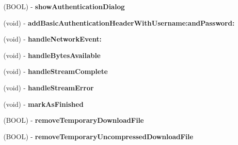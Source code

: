 \begin{DoxyCompactItemize}
\item 
\hypertarget{interface_a_s_i_h_t_t_p_request_a64d812546f152b29ddd614938ffa5539}{
(\-B\-O\-O\-L) -\/ {\bfseries show\-Authentication\-Dialog}}
\label{interface_a_s_i_h_t_t_p_request_a64d812546f152b29ddd614938ffa5539}

\item 
\hypertarget{interface_a_s_i_h_t_t_p_request_a0295b7fbbc9af2be76f9dfe06f75f1ca}{
(void) -\/ {\bfseries add\-Basic\-Authentication\-Header\-With\-Username\-:and\-Password\-:}}
\label{interface_a_s_i_h_t_t_p_request_a0295b7fbbc9af2be76f9dfe06f75f1ca}

\item 
\hypertarget{interface_a_s_i_h_t_t_p_request_a271ec6e669cafa5063866022fb3577ba}{
(void) -\/ {\bfseries handle\-Network\-Event\-:}}
\label{interface_a_s_i_h_t_t_p_request_a271ec6e669cafa5063866022fb3577ba}

\item 
\hypertarget{interface_a_s_i_h_t_t_p_request_aefae44a699dc9e70b78930322cfb3558}{
(void) -\/ {\bfseries handle\-Bytes\-Available}}
\label{interface_a_s_i_h_t_t_p_request_aefae44a699dc9e70b78930322cfb3558}

\item 
\hypertarget{interface_a_s_i_h_t_t_p_request_aaf27f7d11cd1194d5087db56cc553d89}{
(void) -\/ {\bfseries handle\-Stream\-Complete}}
\label{interface_a_s_i_h_t_t_p_request_aaf27f7d11cd1194d5087db56cc553d89}

\item 
\hypertarget{interface_a_s_i_h_t_t_p_request_ab792c755bbcec55490688d2b5aa729ec}{
(void) -\/ {\bfseries handle\-Stream\-Error}}
\label{interface_a_s_i_h_t_t_p_request_ab792c755bbcec55490688d2b5aa729ec}

\item 
\hypertarget{interface_a_s_i_h_t_t_p_request_a0b812d27bc2a7ad7715e6d890923426e}{
(void) -\/ {\bfseries mark\-As\-Finished}}
\label{interface_a_s_i_h_t_t_p_request_a0b812d27bc2a7ad7715e6d890923426e}

\item 
\hypertarget{interface_a_s_i_h_t_t_p_request_a0e68fd4f22a1b5cdcfb3e63a3cdacde9}{
(\-B\-O\-O\-L) -\/ {\bfseries remove\-Temporary\-Download\-File}}
\label{interface_a_s_i_h_t_t_p_request_a0e68fd4f22a1b5cdcfb3e63a3cdacde9}

\item 
\hypertarget{interface_a_s_i_h_t_t_p_request_af8ef43877926d01b8a51abb62dd2e208}{
(\-B\-O\-O\-L) -\/ {\bfseries remove\-Temporary\-Uncompressed\-Download\-File}}
\label{interface_a_s_i_h_t_t_p_request_af8ef43877926d01b8a51abb62dd2e208}


\end{DoxyCompactItemize}
